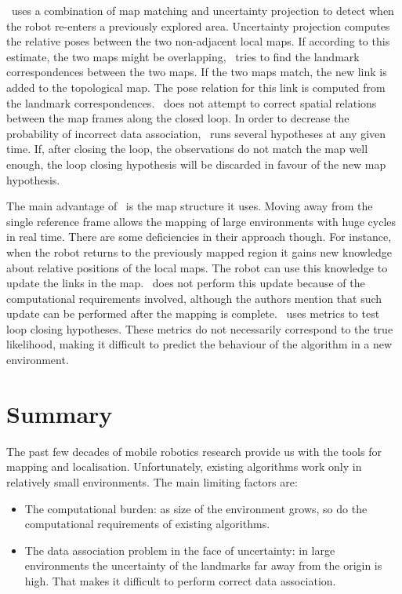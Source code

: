 \Atlas\ uses a combination of map matching and uncertainty projection
to detect when the robot re-enters a previously explored
area. Uncertainty projection computes the relative poses between the
two non-adjacent local maps. If according to this estimate, the two
maps might be overlapping, \Atlas\ tries to find the landmark
correspondences between the two maps. If the two maps match, the new
link is added to the topological map. The pose relation for this link
is computed from the landmark correspondences. \Atlas\ does not
attempt to correct spatial relations between the map frames along the
closed loop. In order to decrease the probability of incorrect data
association, \Atlas\ runs several hypotheses at any given time. If,
after closing the loop, the observations do not match the map well
enough, the loop closing hypothesis will be discarded in favour of the
new map hypothesis.

The main advantage of \Atlas\ is the map structure it uses. Moving
away from the single reference frame allows the mapping of large
environments with huge cycles in real time. There are some
deficiencies in their approach though. For instance, when the robot
returns to the previously mapped region it gains new knowledge about
relative positions of the local maps. The robot can use this knowledge
to update the links in the map. \Atlas\ does not perform this update
because of the computational requirements involved, although the
authors mention that such update can be performed after the mapping is
complete. \Atlas\ uses metrics to test loop closing hypotheses. These
metrics do not necessarily correspond to the true likelihood, making
it difficult to predict the behaviour of the algorithm in a new
environment. 


\section{Summary}

The past few decades of mobile robotics research provide us with
the tools for mapping and localisation. Unfortunately, existing
algorithms work only in relatively small environments. The main
limiting factors are:

\begin{itemize}
\item The computational burden: as size of the environment grows, so do
  the computational requirements of existing algorithms.

\item The data association problem in the face of uncertainty: 
   in large environments the uncertainty of the landmarks far away
  from the origin is high. That makes it difficult to perform correct
  data association.

\end{itemize}

